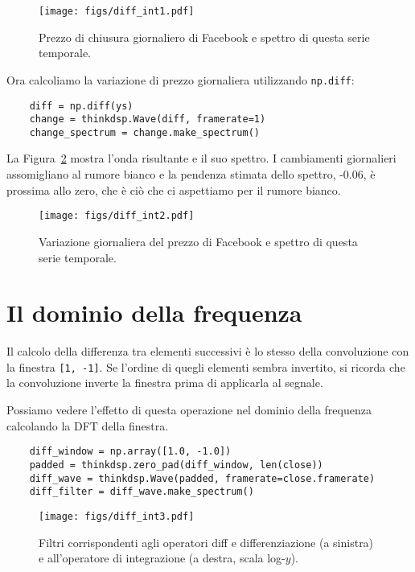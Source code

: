 \documentclass[12pt]{book} \usepackage[width=5.5in,height=8.5in, hmarginratio=3:2,vmarginratio=1:1]{geometry}
\begin{document}
\begin{figure} 

\centerline{\texttt{[image: figs/diff\_int1.pdf]}} \caption{Prezzo di chiusura giornaliero di Facebook e spettro di questa serie temporale.} \label{fig.diff_int1} \end{figure} 

Ora calcoliamo la variazione di prezzo giornaliera utilizzando {\tt np.diff}:

\begin{verbatim} 
    diff = np.diff(ys)
    change = thinkdsp.Wave(diff, framerate=1)
    change_spectrum = change.make_spectrum()
 \end{verbatim} 

La Figura~\ref{fig.diff_int2} mostra l'onda risultante e il suo spettro. I cambiamenti giornalieri assomigliano al rumore bianco e la pendenza stimata dello spettro, -0.06, è prossima allo zero, che è ciò che ci aspettiamo per il rumore bianco.

\begin{figure} 

\centerline{\texttt{[image: figs/diff\_int2.pdf]}} \caption{Variazione giornaliera del prezzo di Facebook e spettro di questa serie temporale.} \label{fig.diff_int2} \end{figure} 

\section{Il dominio della frequenza} 

Il calcolo della differenza tra elementi successivi è lo stesso della convoluzione con la finestra {\tt [1, -1]}. Se l'ordine di quegli elementi sembra invertito, si ricorda che la convoluzione inverte la finestra prima di applicarla al segnale.

Possiamo vedere l'effetto di questa operazione nel dominio della frequenza calcolando la DFT della finestra.

\begin{verbatim} 
    diff_window = np.array([1.0, -1.0])
    padded = thinkdsp.zero_pad(diff_window, len(close))
    diff_wave = thinkdsp.Wave(padded, framerate=close.framerate)
    diff_filter = diff_wave.make_spectrum()
 \end{verbatim} 

\begin{figure} 

\centerline{\texttt{[image: figs/diff\_int3.pdf]}} \caption{Filtri corrispondenti agli operatori diff e differenziazione (a sinistra) e all'operatore di integrazione (a destra, scala log-$y$).} \label{fig.diff_int3} \end{figure} 
\end{document}
